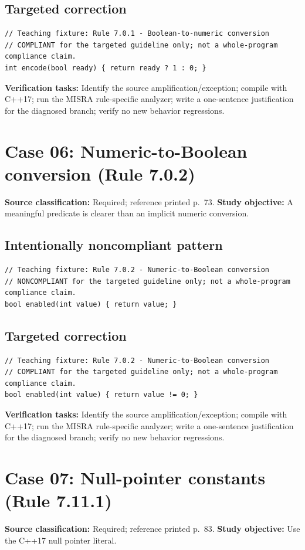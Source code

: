\documentclass[10pt,letterpaper]{article}
\begin{document}
\subsection*{Targeted correction}
\begin{lstlisting}
// Teaching fixture: Rule 7.0.1 - Boolean-to-numeric conversion
// COMPLIANT for the targeted guideline only; not a whole-program compliance claim.
int encode(bool ready) { return ready ? 1 : 0; }
\end{lstlisting}
\textbf{Verification tasks:} Identify the source amplification/exception; compile with C++17; run the MISRA rule-specific analyzer; write a one-sentence justification for the diagnosed branch; verify no new behavior regressions.

\section{Case 06: Numeric-to-Boolean conversion (Rule 7.0.2)}
\textbf{Source classification:} Required; reference printed p.~73. \textbf{Study objective:} A meaningful predicate is clearer than an implicit numeric conversion.
\subsection*{Intentionally noncompliant pattern}
\begin{lstlisting}
// Teaching fixture: Rule 7.0.2 - Numeric-to-Boolean conversion
// NONCOMPLIANT for the targeted guideline only; not a whole-program compliance claim.
bool enabled(int value) { return value; }
\end{lstlisting}
\subsection*{Targeted correction}
\begin{lstlisting}
// Teaching fixture: Rule 7.0.2 - Numeric-to-Boolean conversion
// COMPLIANT for the targeted guideline only; not a whole-program compliance claim.
bool enabled(int value) { return value != 0; }
\end{lstlisting}
\textbf{Verification tasks:} Identify the source amplification/exception; compile with C++17; run the MISRA rule-specific analyzer; write a one-sentence justification for the diagnosed branch; verify no new behavior regressions.

\section{Case 07: Null-pointer constants (Rule 7.11.1)}
\textbf{Source classification:} Required; reference printed p.~83. \textbf{Study objective:} Use the C++17 null pointer literal.
\end{document}
